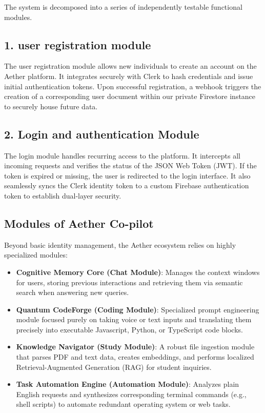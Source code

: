 The system is decomposed into a series of independently testable functional modules.

\subsection{1. user registration module}
The user registration module allows new individuals to create an account on the Aether platform. It integrates securely with Clerk to hash credentials and issue initial authentication tokens. Upon successful registration, a webhook triggers the creation of a corresponding user document within our private Firestore instance to securely house future data.

\subsection{2. Login and authentication Module}
The login module handles recurring access to the platform. It intercepts all incoming requests and verifies the status of the JSON Web Token (JWT). If the token is expired or missing, the user is redirected to the login interface. It also seamlessly syncs the Clerk identity token to a custom Firebase authentication token to establish dual-layer security.

\subsection{Modules of Aether Co-pilot}
Beyond basic identity management, the Aether ecosystem relies on highly specialized modules:
\begin{itemize}
    \item \textbf{Cognitive Memory Core (Chat Module)}: Manages the context windows for users, storing previous interactions and retrieving them via semantic search when answering new queries.
    \item \textbf{Quantum CodeForge (Coding Module)}: Specialized prompt engineering module focused purely on taking voice or text inputs and translating them precisely into executable Javascript, Python, or TypeScript code blocks.
    \item \textbf{Knowledge Navigator (Study Module)}: A robust file ingestion module that parses PDF and text data, creates embeddings, and performs localized Retrieval-Augmented Generation (RAG) for student inquiries.
    \item \textbf{Task Automation Engine (Automation Module)}: Analyzes plain English requests and synthesizes corresponding terminal commands (e.g., shell scripts) to automate redundant operating system or web tasks.
\end{itemize}

\newpage
